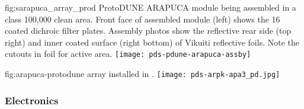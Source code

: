 \begin{dunefigure}{fig:sarapuca_array_prod}
{ProtoDUNE ARAPUCA module being assembled in a class 100,000 clean area.  Front face of assembled module (left) shows the 16 coated dichroic filter plates.  Assembly photos show the reflective rear side (top right) and inner coated surface (right bottom) of Vikuiti reflective foils.  Note the cutouts in foil for  active area.}
	\texttt{[image: pds-pdune-arapuca-assby]}
\end{dunefigure}


\begin{dunefigure}{fig:arapuca-protodune}
{ array installed in .} 
\texttt{[image: pds-arpk-apa3\_pd.jpg]} 
\end{dunefigure}


\subsubsection{ Electronics}
\label{sec:ssp-protodune-electronics}




